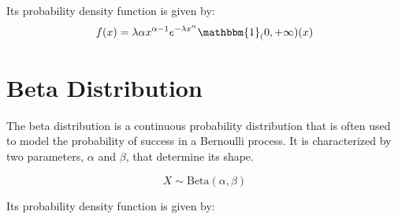 Its probability density function is given by:
\[
f(x) = \lambda \alpha x^{\alpha-1} e^{-\lambda x^\alpha} \mathbbm{1}_(0, +\infty)(x)
\]


\section{Beta Distribution}

The beta distribution is a continuous probability distribution that is often used to model the probability of success in a Bernoulli process. It is characterized by two parameters, $\alpha$ and $\beta$, that determine its shape.

\[
X \sim \text{Beta}(\alpha, \beta)
\]

Its probability density function is given by:
